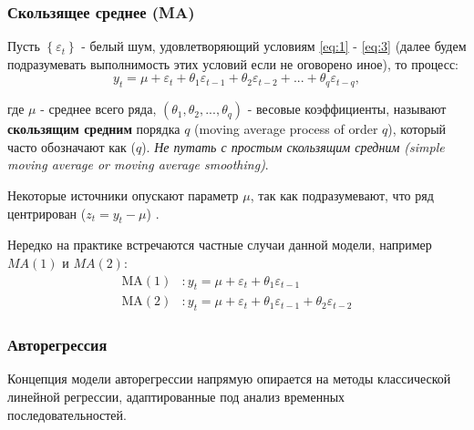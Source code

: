 
\subsubsection{Скользящее среднее (MA)}

Пусть $\left\{ \varepsilon_t \right\}$ - белый шум, удовлетворяющий условиям 
\eqref{eq:1} - \eqref{eq:3} (далее будем подразумевать выполнимость этих 
условий если не оговорено иное), то процесс:
\begin{equation*}
    y_t = \mu + \varepsilon_t + \theta_1 \varepsilon_{t-1} + 
    \theta_2 \varepsilon_{t-2} + ... + \theta_q \varepsilon_{t-q},
\end{equation*}

где $\mu$ - среднее всего ряда, $(\theta_1, \theta_2, ..., \theta_q)$ - 
весовые коэффициенты, называют \textbf{скользящим средним} порядка $q$ 
(moving average process of order $q$), который часто 
обозначают как ($q$). \textit{Не путать с простым 
скользящим средним (simple moving average or moving average smoothing)}.

Некоторые источники опускают параметр $\mu$, так как подразумевают, что ряд 
центрирован ($z_t = y_t - \mu$) \cite{TSA_Box}.

Нередко на практике встречаются частные случаи данной модели, например $MA(1)$ и 
$MA(2)$:
\begin{align*}
    \text{MA}(1) &: y_t = \mu + \varepsilon_t + \theta_1 \varepsilon_{t-1} \\
    \text{MA}(2) &: y_t = \mu + \varepsilon_t + \theta_1 \varepsilon_{t-1} + \theta_2 \varepsilon_{t-2}
\end{align*}

\subsubsection{Авторегрессия}

Концепция модели авторегрессии напрямую опирается 
на методы классической линейной регрессии, адаптированные под 
анализ временных последовательностей.


